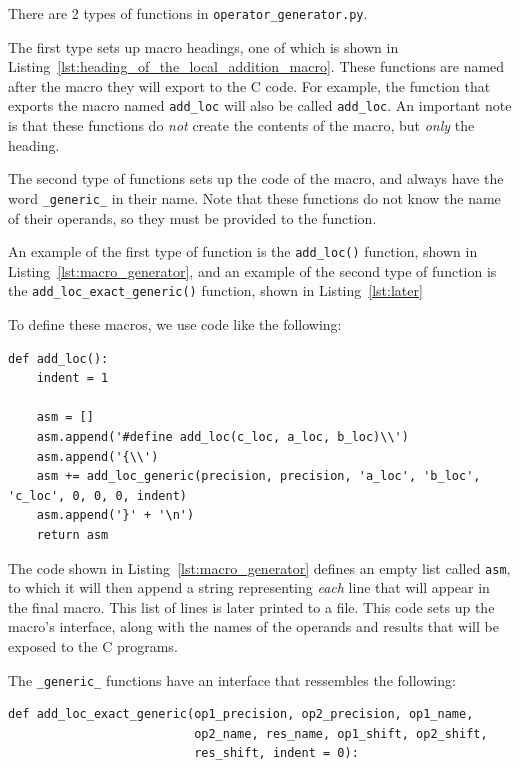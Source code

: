 \documentclass[10pt, a4paper]{report}
\begin{document}
There are 2 types of functions in \verb+operator_generator.py+.

The first type sets up macro headings, one of which is shown in
Listing~\ref{lst:heading_of_the_local_addition_macro}.
These functions are named after the macro they will export to the C code.
For example, the function that exports the macro named \verb+add_loc+ will also
be called \verb+add_loc+.
An important note is that these functions do \emph{not} create the contents of
the macro, but \emph{only} the heading.

The second type of functions sets up the code of the macro, and always have the
word \verb+_generic_+ in their name.
Note that these functions do not know the name of their operands, so they must
be provided to the function.

An example of the first type of function is the \verb+add_loc()+ function, shown
in Listing~\ref{lst:macro_generator}, and an example of the second type of
function is the \verb+add_loc_exact_generic()+ function, shown in
Listing~\ref{lst:later}

To define these macros, we use code like the following:
\begin{lstlisting}
def add_loc():
    indent = 1

    asm = []
    asm.append('#define add_loc(c_loc, a_loc, b_loc)\\')
    asm.append('{\\')
    asm += add_loc_generic(precision, precision, 'a_loc', 'b_loc', 'c_loc', 0, 0, 0, indent)
    asm.append('}' + '\n')
    return asm
\end{lstlisting}

The code shown in Listing~\ref{lst:macro_generator} defines an empty list called
\verb+asm+, to which it will then append a string representing \emph{each} line
that will appear in the final macro.
This list of lines is later printed to a file.
This code sets up the macro's interface, along with the names of the operands
and results that will be exposed to the C programs.

The \verb+_generic_+ functions have an interface that ressembles the following:
\begin{lstlisting}
def add_loc_exact_generic(op1_precision, op2_precision, op1_name,
                          op2_name, res_name, op1_shift, op2_shift,
                          res_shift, indent = 0):
\end{lstlisting}
\end{document}
